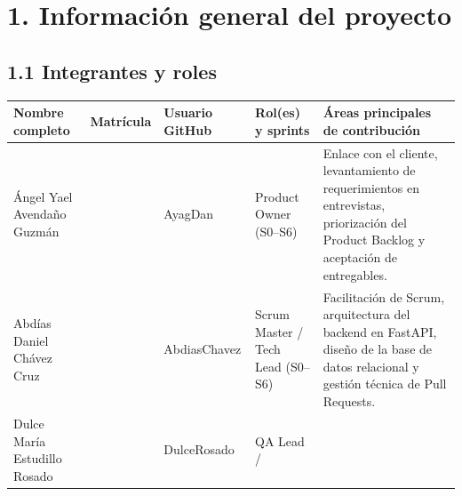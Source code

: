\section{1. Información general del
proyecto}\label{informaciuxf3n-general-del-proyecto}

\subsection{1.1 Integrantes y roles}\label{integrantes-y-roles}

{\def\LTcaptype{none} %
\begin{longtable}[]{@{}
  >{\raggedright\arraybackslash}p{}
  >{\raggedright\arraybackslash}p{}
  >{\raggedright\arraybackslash}p{}
  >{\raggedright\arraybackslash}p{}
  >{\raggedright\arraybackslash}p{}@{}}
\toprule\noalign{}
\begin{minipage}[b]{\linewidth}\raggedright
\textbf{Nombre completo}
\end{minipage} & \begin{minipage}[b]{\linewidth}\raggedright
\textbf{Matrícula}
\end{minipage} & \begin{minipage}[b]{\linewidth}\raggedright
\textbf{Usuario GitHub}
\end{minipage} & \begin{minipage}[b]{\linewidth}\raggedright
\textbf{Rol(es) y sprints}
\end{minipage} & \begin{minipage}[b]{\linewidth}\raggedright
\textbf{Áreas principales de contribución}
\end{minipage} \\
\midrule\noalign{}
\endhead
\bottomrule\noalign{}
\endlastfoot
Ángel Yael Avendaño Guzmán & 0224170023 & AyagDan & Product Owner
(S0--S6) & Enlace con el cliente, levantamiento de requerimientos en
entrevistas, priorización del Product Backlog y aceptación de
entregables. \\
Abdías Daniel Chávez Cruz & 0224170024 & AbdiasChavez & Scrum Master /
Tech Lead (S0--S6) & Facilitación de Scrum, arquitectura del backend en
FastAPI, diseño de la base de datos relacional y gestión técnica de Pull
Requests. \\
Dulce María Estudillo Rosado & 0224170028 & DulceRosado & QA Lead /

\end{longtable}}
